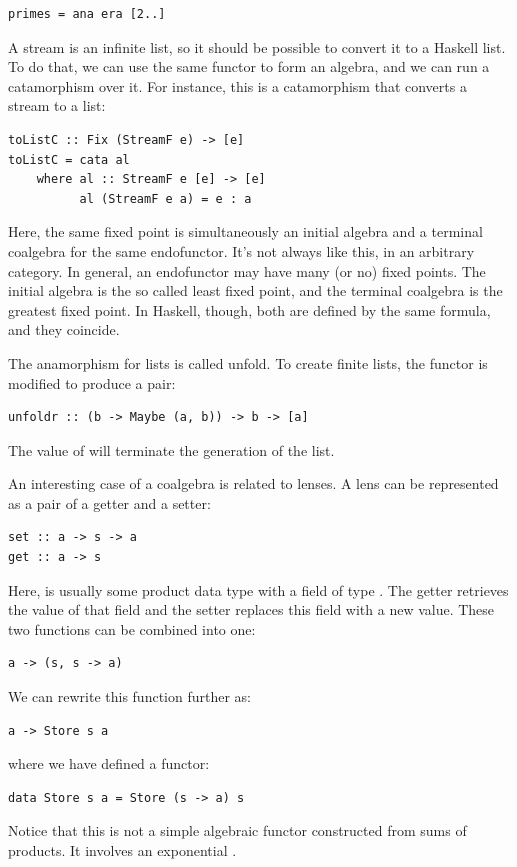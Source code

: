 \begin{verbatim}
primes = ana era [2..]
\end{verbatim}
A stream is an infinite list, so it should be possible to convert it to
a Haskell list. To do that, we can use the same functor 
to form an algebra, and we can run a catamorphism over it. For instance,
this is a catamorphism that converts a stream to a list:

\begin{verbatim}
toListC :: Fix (StreamF e) -> [e]
toListC = cata al
    where al :: StreamF e [e] -> [e] 
          al (StreamF e a) = e : a
\end{verbatim}
Here, the same fixed point is simultaneously an initial algebra and a
terminal coalgebra for the same endofunctor. It's not always like this,
in an arbitrary category. In general, an endofunctor may have many (or
no) fixed points. The initial algebra is the so called least fixed
point, and the terminal coalgebra is the greatest fixed point. In
Haskell, though, both are defined by the same formula, and they
coincide.

The anamorphism for lists is called unfold. To create finite lists, the
functor is modified to produce a  pair:

\begin{verbatim}
unfoldr :: (b -> Maybe (a, b)) -> b -> [a]
\end{verbatim}
The value of  will terminate the generation of the list.

An interesting case of a coalgebra is related to lenses. A lens can be
represented as a pair of a getter and a setter:

\begin{verbatim}
set :: a -> s -> a
get :: a -> s
\end{verbatim}
Here,  is usually some product data type with a field of type
. The getter retrieves the value of that field and the setter
replaces this field with a new value. These two functions can be
combined into one:

\begin{verbatim}
a -> (s, s -> a)
\end{verbatim}
We can rewrite this function further as:

\begin{verbatim}
a -> Store s a
\end{verbatim}
where we have defined a functor:

\begin{verbatim}
data Store s a = Store (s -> a) s
\end{verbatim}
Notice that this is not a simple algebraic functor constructed from sums
of products. It involves an exponential .

